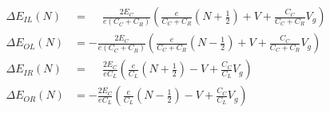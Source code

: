 \documentclass[../main.tex]{subfiles}
\begin{document}
\begin{align*}
    \Delta E_{IL}(N) &= \phantom{-}\frac{2E_{C}}{e(C_{C} + C_{R})}\left(\frac{e}{C_{C} + C_{R}}\left(N + \frac{1}{2}\right) + V + \frac{C_{C}}{C_{C} + C_{R}}V_{g}\right)\\
    \Delta E_{OL}(N) &= -\frac{2E_{C}}{e(C_{C} + C_{R})}\left(\frac{e}{C_{C} + C_{R}}\left(N - \frac{1}{2}\right) + V + \frac{C_{C}}{C_{C} + C_{R}}V_{g}\right)\\
    \Delta E_{IR}(N) &= \phantom{-}\frac{2E_{C}}{eC_{L}}               \left(\frac{e}{C_{L}}\left(N + \frac{1}{2}\right) - V + \frac{C_{C}}{C_{L}}V_{g}\right)\\
    \Delta E_{OR}(N) &= -\frac{2E_{C}}{eC_{L}}               \left(\frac{e}{C_{L}}\left(N - \frac{1}{2}\right) - V + \frac{C_{C}}{C_{L}}V_{g}\right)
\end{align*}
\end{document}
